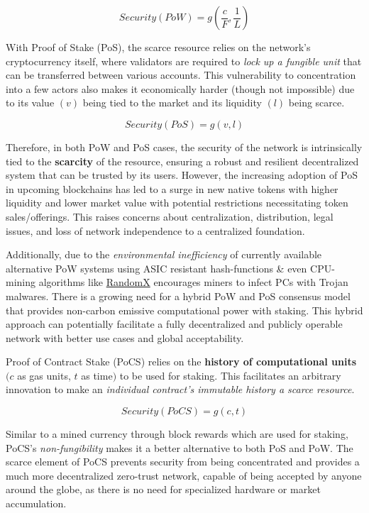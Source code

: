 \documentclass{article}
\begin{document}
\[
Security(PoW) = g\left(\frac{c}{F},\frac{1}{L}\right)
\]

With Proof of Stake (PoS), the scarce resource relies on the network's cryptocurrency itself, where validators are required to \textit{lock up a fungible unit} that can be transferred between various accounts. This vulnerability to concentration into a few actors also makes it economically harder (though not impossible) due to its value $(v)$ being tied to the market and its liquidity $(l)$ being scarce.

\[
Security(PoS) = g(v,l)
\]

Therefore, in both PoW and PoS cases, the security of the network is intrinsically tied to the \textbf{scarcity} of the resource, ensuring a robust and resilient decentralized system that can be trusted by its users. However, the increasing adoption of PoS in upcoming blockchains has led to a surge in new native tokens with higher liquidity and lower market value with potential restrictions necessitating token sales/offerings. This raises concerns about centralization, distribution, legal issues, and loss of network independence to a centralized foundation.

Additionally, due to the \textit{environmental inefficiency} of currently available alternative PoW systems using ASIC resistant hash-functions \& even CPU-mining algorithms like \href{https://github.com/tevador/RandomX}{RandomX} encourages miners to infect PCs with Trojan malwares. There is a growing need for a hybrid PoW and PoS consensus model that provides non-carbon emissive computational power with staking. This hybrid approach can potentially facilitate a fully decentralized and publicly operable network with better use cases and global acceptability.

Proof of Contract Stake (PoCS) relies on the \textbf{history of computational units} $(c$ as gas units, $t$ as time$)$ to be used for staking. This facilitates an arbitrary innovation to make an \textit{individual contract's immutable history a scarce resource}.

\[
Security(PoCS) = g(c,t)
\]

Similar to a mined currency through block rewards which are used for staking, PoCS's \textit{non-fungibility} makes it a better alternative to both PoS and PoW. The scarce element of PoCS prevents security from being concentrated and provides a much more decentralized zero-trust network, capable of being accepted by anyone around the globe, as there is no need for specialized hardware or market accumulation.
\end{document}
